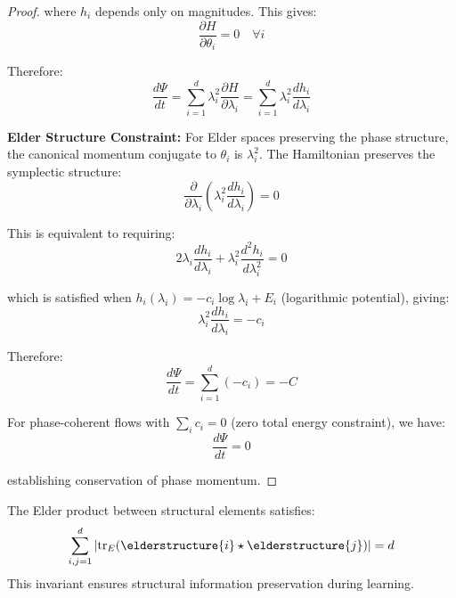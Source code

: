 \begin{proof}
where $h_i$ depends only on magnitudes. This gives:
$$\frac{\partial H}{\partial \theta_i} = 0 \quad \forall i$$

Therefore:
$$\frac{d\Psi}{dt} = \sum_{i=1}^{d} \lambda_i^2 \frac{\partial H}{\partial \lambda_i} = \sum_{i=1}^{d} \lambda_i^2 \frac{dh_i}{d\lambda_i}$$

\textbf{Elder Structure Constraint:}
For Elder spaces preserving the phase structure, the canonical momentum conjugate to $\theta_i$ is $\lambda_i^2$. The Hamiltonian preserves the symplectic structure:
$$\frac{\partial}{\partial \lambda_i}\left(\lambda_i^2 \frac{dh_i}{d\lambda_i}\right) = 0$$

This is equivalent to requiring:
$$2\lambda_i \frac{dh_i}{d\lambda_i} + \lambda_i^2 \frac{d^2h_i}{d\lambda_i^2} = 0$$

which is satisfied when $h_i(\lambda_i) = -c_i \log \lambda_i + E_i$ (logarithmic potential), giving:
$$\lambda_i^2 \frac{dh_i}{d\lambda_i} = -c_i$$

Therefore:
$$\frac{d\Psi}{dt} = \sum_{i=1}^{d} (-c_i) = -C$$

For phase-coherent flows with $\sum_i c_i = 0$ (zero total energy constraint), we have:
$$\frac{d\Psi}{dt} = 0$$

establishing conservation of phase momentum.
\end{proof}

\begin{theorem}
\label{thm:structural_conservation}
The Elder product between structural elements satisfies:
\begin{equation}
\sum_{i,j=1}^{d} |\mathrm{tr}_E(\elderstructure{i} \star \elderstructure{j})| = d
\end{equation}
This invariant ensures structural information preservation during learning.
\end{theorem}

